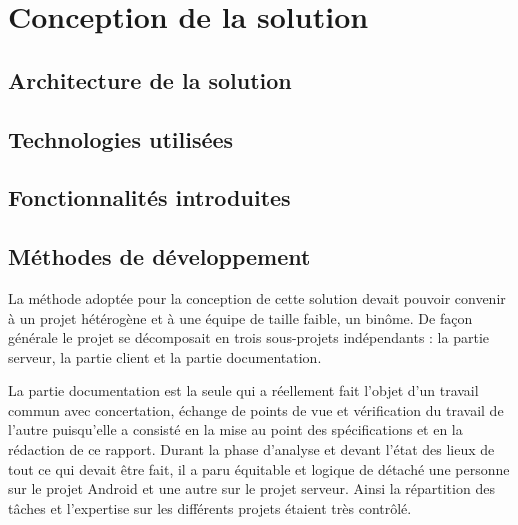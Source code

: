 \section{Conception de la solution}

\subsection{Architecture de la solution}

    

    

\subsection{Technologies utilisées}

    

    

\subsection{Fonctionnalités introduites}

    
    
    

\subsection{Méthodes de développement}

La méthode adoptée pour la conception de cette solution devait pouvoir convenir à un projet hétérogène et à une équipe de taille faible, un binôme. De façon générale le projet se décomposait en trois sous-projets indépendants : la partie serveur, la partie client et la partie documentation.

La partie documentation est la seule qui a réellement fait l’objet d’un travail commun avec concertation, échange de points de vue et vérification du travail de l’autre puisqu’elle a consisté en la mise au point des spécifications et en la rédaction de ce rapport. Durant la phase d’analyse et devant l’état des lieux de tout ce qui devait être fait, il a paru équitable et logique de détaché une personne sur le projet Android et une autre sur le projet serveur. Ainsi la répartition des tâches et l’expertise sur les différents projets étaient très contrôlé.

